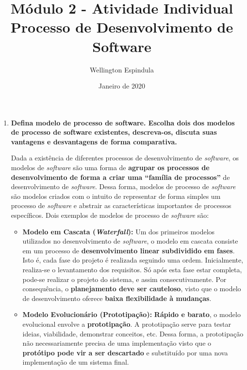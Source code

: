 \documentclass[12pt, a4paper]{article}
\title{Módulo 2 - Atividade Individual \\
  \large Processo de Desenvolvimento de Software}
\author{Wellington Espindula}
\date{Janeiro de 2020}
\newcommand{\tit}[1]{\textit{#1}}
\newcommand{\tb}[1]{\textbf{#1}}
\newcommand{\sw}{\tit{software}}
\newcommand{\ssw}{\tit{software} }
\newcommand{\question}[1]{\item \tb{#1}}
\newcommand{\answer}[1]{\par #1}
\newcommand{\quotes}[1]{``#1''}
\begin{document}
    \maketitle
    
    \begin{enumerate}[label=\textbf{\arabic*.}]
        \question{Defina modelo de processo de software. Escolha dois dos modelos de processo de software existentes, descreva-os, discuta suas vantagens e desvantagens de forma comparativa.}
        \answer{
        Dada a existência de diferentes processos de desenvolvimento de \sw, os modelos de \ssw são uma forma de \tb{agrupar os processos de desenvolvimento de forma a criar uma \quotes{família de processos}} de desenvolvimento de \sw. Dessa forma, modelos de processo de \ssw são modelos criados com o intuito de representar de forma simples um processo de \ssw e abstrair as características importantes de processos específicos. Dois exemplos de modelos de processo de \ssw são:
        \begin{itemize}
            \item \tb{Modelo em Cascata (\tit{Waterfall}):} Um dos primeiros modelos utilizados no desenvolvimento de \sw, o modelo em cascata consiste em um processo de \tb{desenvolvimento linear subdividido em fases}. Isto é, cada fase do projeto é realizada seguindo uma ordem. Inicialmente, realiza-se o levantamento dos requisitos. Só após esta fase estar completa, pode-se realizar o projeto do sistema, e assim consecutivamente. Por consequência, o \tb{planejamento deve ser cauteloso}, visto que o modelo de desenvolvimento oferece \tb{baixa flexibilidade à mudanças}.
            \item \tb{Modelo Evolucionário (Prototipação):} \tb{Rápido e barato}, o modelo evolucional envolve a \tb{prototipação}. A prototipação serve para testar ideias, viabilidade, demonstrar conceitos, etc. Dessa forma, a prototipação não necessariamente precisa de uma implementação visto que o \tb{protótipo pode vir a ser descartado} e substituído por uma nova implementação de um sistema final.

        \end{itemize}
        
}
\end{enumerate}
\end{document}

